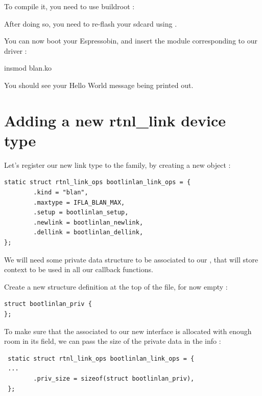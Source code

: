To compile it, you need to use buildroot :

After doing so, you need to re-flash your sdcard using .
 
You can now boot your Espressobin, and insert the module corresponding to our driver :
 
\begin{targetbashinput}
insmod blan.ko
\end{targetbashinput}
 
 You should see your Hello World message being printed out.
 
 \section{Adding a new rtnl\_link device type}
 
 Let's register our new link type to the  family, by creating a
 new  object :
 
\begin{verbatim}
static struct rtnl_link_ops bootlinlan_link_ops = {
        .kind = "blan",
        .maxtype = IFLA_BLAN_MAX,
        .setup = bootlinlan_setup,
        .newlink = bootlinlan_newlink,
        .dellink = bootlinlan_dellink,
};
\end{verbatim}

 We will need some private data structure to be associated to our , that will store context to be used in all our callback functions.

 Create a new structure definition at the top of the file, for now empty :

\begin{verbatim}
struct bootlinlan_priv {
};
\end{verbatim}

To make sure that the  associated to our new interface is allocated with enough
room in its  field, we can pass the size of the private data in the  info :

 \begin{verbatim}
 static struct rtnl_link_ops bootlinlan_link_ops = {
 ...
        .priv_size = sizeof(struct bootlinlan_priv),
 };
 \end{verbatim}
 
